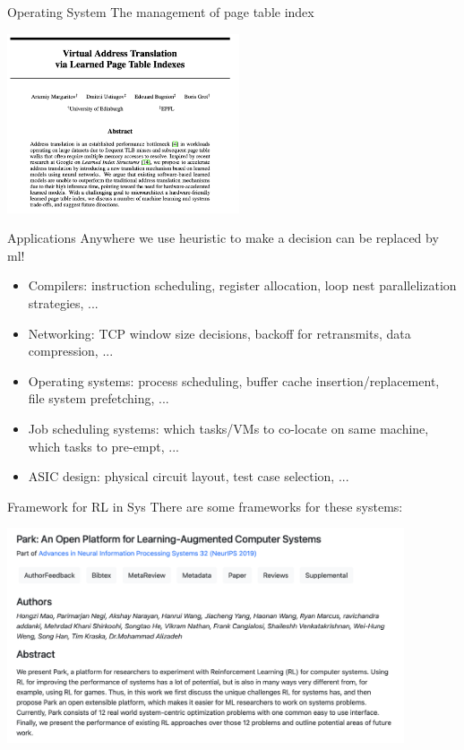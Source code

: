 \documentclass[UTF8]{beamer}
\begin{document}
\begin{frame}{Operating System}
  The management of page table index
  \begin{center}
    \includegraphics[height=150pt]{figure/page_index.png}
  \end{center}
\end{frame}

\begin{frame}{Applications}
  Anywhere we use heuristic to make a decision can be replaced by ml!
  \begin{itemize}
    \item <2-> Compilers: instruction scheduling, register allocation, loop nest parallelization strategies, ...
    \item <2-> Networking: TCP window size decisions, backoff for retransmits, data compression, ...
    \item <2-> Operating systems: process scheduling, buffer cache insertion/replacement, file system prefetching, ...
    \item <2-> Job scheduling systems: which tasks/VMs to co-locate on same machine, which tasks to pre-empt, ...
    \item <2-> ASIC design: physical circuit layout, test case selection, ...
  \end{itemize}
\end{frame}

\begin{frame}{Framework for RL in Sys}
  There are some frameworks for these systems:
  \begin{center}
    \includegraphics[height=180pt]{figure/park_project.png}
  \end{center}
\end{frame}
\end{document}
